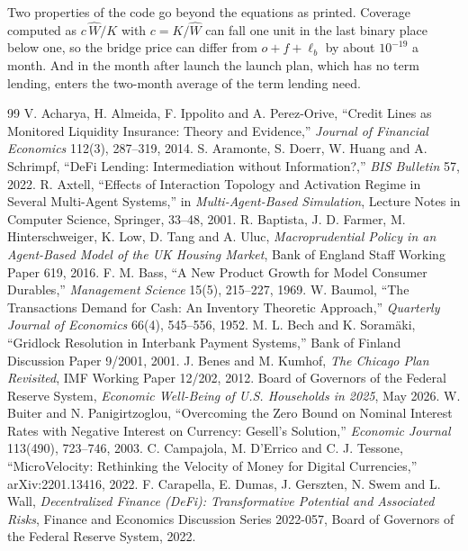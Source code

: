 \documentclass[10pt,a4paper]{article}
\theoremstyle{remark}
\newcommand{\cyc}[1]{\widehat{#1}}
\begin{document}
Two properties of the code go beyond the equations as printed. Coverage
computed as \(c\,\cyc W/K\) with \(c=K/\cyc W\) can fall one unit in the last
binary place below one, so the bridge price can differ from \(o+f+\ell_b\) by
about \(10^{-19}\) a month. And in the month after launch the launch plan,
which has no term lending, enters the two-month average of the term lending
need.



\begin{thebibliography}{99}\small
 V. Acharya, H. Almeida, F. Ippolito and A. Perez-Orive, ``Credit Lines as Monitored Liquidity Insurance: Theory and Evidence,'' \emph{Journal of Financial Economics} 112(3), 287--319, 2014.
 S. Aramonte, S. Doerr, W. Huang and A. Schrimpf, ``DeFi Lending: Intermediation without Information?,'' \emph{BIS Bulletin} 57, 2022.
 R. Axtell, ``Effects of Interaction Topology and Activation Regime in Several Multi-Agent Systems,'' in \emph{Multi-Agent-Based Simulation}, Lecture Notes in Computer Science, Springer, 33--48, 2001.
 R. Baptista, J. D. Farmer, M. Hinterschweiger, K. Low, D. Tang and A. Uluc, \emph{Macroprudential Policy in an Agent-Based Model of the UK Housing Market}, Bank of England Staff Working Paper 619, 2016.
 F. M. Bass, ``A New Product Growth for Model Consumer Durables,'' \emph{Management Science} 15(5), 215--227, 1969.
 W. Baumol, ``The Transactions Demand for Cash: An Inventory Theoretic Approach,'' \emph{Quarterly Journal of Economics} 66(4), 545--556, 1952.
 M. L. Bech and K. Soram\"aki, ``Gridlock Resolution in Interbank Payment Systems,'' Bank of Finland Discussion Paper 9/2001, 2001.
 J. Benes and M. Kumhof, \emph{The Chicago Plan Revisited}, IMF Working Paper 12/202, 2012.
 Board of Governors of the Federal Reserve System, \emph{Economic Well-Being of U.S. Households in 2025}, May 2026.
 W. Buiter and N. Panigirtzoglou, ``Overcoming the Zero Bound on Nominal Interest Rates with Negative Interest on Currency: Gesell's Solution,'' \emph{Economic Journal} 113(490), 723--746, 2003.
 C. Campajola, M. D'Errico and C. J. Tessone, ``MicroVelocity: Rethinking the Velocity of Money for Digital Currencies,'' arXiv:2201.13416, 2022.
 F. Carapella, E. Dumas, J. Gerszten, N. Swem and L. Wall, \emph{Decentralized Finance (DeFi): Transformative Potential and Associated Risks}, Finance and Economics Discussion Series 2022-057, Board of Governors of the Federal Reserve System, 2022.

\end{thebibliography}
\end{document}
